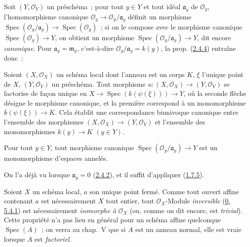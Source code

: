 Soit $(Y,\mathscr{O}_Y)$ un préschéma~; pour tout $y\in Y$ et tout idéal
$\mathfrak{a}_y$ de $\mathscr{O}_y$, l'homomorphisme canonique
$\mathscr{O}_y\to\mathscr{O}_y/\mathfrak{a}_y$ définit un morphisme
$\operatorname{Spec}(\mathscr{O}_y/\mathfrak{a}_y)
\to\operatorname{Spec}(\mathscr{O}_y)$~; si on le compose avec le morphisme
canonique $\operatorname{Spec}(\mathscr{O}_y)\to Y$, on obtient un morphisme
$\operatorname{Spec}(\mathscr{O}_y/\mathfrak{a}_y)\to Y$, dit encore
\emph{canonique}. Pour $\mathfrak{a}_y=\mathfrak{m}_y$, c'est-à-dire
$\mathscr{O}_y/\mathfrak{a}_y=k(y)$, la prop.
(\hyperref[I.2.4.4-fr]{2.4.4}) entraîne donc~:

\begin{corollary}[2.4.6]
\label{I.2.4.6-fr}
Soient $(X,\mathscr{O}_X)$ un schéma local dont l'anneau est un corps $K$,
$\xi$ l'unique point de $X$, $(Y,\mathscr{O}_Y)$ un préschéma. Tout morphisme
$u:(X,\mathscr{O}_X)\to(Y,\mathscr{O}_Y)$ se factorise de façon unique en
$X\to\operatorname{Spec}(k(\psi(\xi)))\to Y$, où la seconde flèche désigne le
morphisme canonique, et la première correspond à un monomorphisme
$k(\psi(\xi))\to K$. Cela établit une correspondance biunivoque canonique
entre l'ensemble des morphismes $(X,\mathscr{O}_X)\to(Y,\mathscr{O}_Y)$ et
l'ensemble des monomorphismes $k(y)\to K$ $(y\in Y)$.
\end{corollary}

\begin{corollary}[2.4.7]
\label{I.2.4.7-fr}
Pour tout $y\in Y$, tout morphisme canonique
$\operatorname{Spec}(\mathscr{O}_y/\mathfrak{a}_y)\to Y$ est un monomorphisme
d'espaces annelés.
\end{corollary}

On l'a déjà vu lorsque $\mathfrak{a}_y=0$
(\hyperref[I.2.4.2-fr]{2.4.2}), et il suffit d'appliquer
(\hyperref[I.1.7.5-fr]{1.7.5}).

\begin{remark}[2.4.8]
\label{I.2.4.8-fr}
Soient $X$ un schéma local, $a$ son unique point fermé. Comme tout ouvert
affine contenant $a$ est nécessairement $X$ tout entier, tout
$\mathscr{O}_X$-Module \emph{inversible}
(\hyperref[0.5.4.1-fr]{0, 5.4.1}) est nécessairement \emph{isomorphe à
$\mathscr{O}_X$} (ou, comme on dit encore, est \emph{trivial}). Cette propriété
n'a pas lieu en général pour un schéma affine quelconque
$\operatorname{Spec}(A)$~; on verra au chap.~V que si $A$ est un anneau normal,
elle est vraie lorsque $A$ est \emph{factoriel}.
\end{remark}

